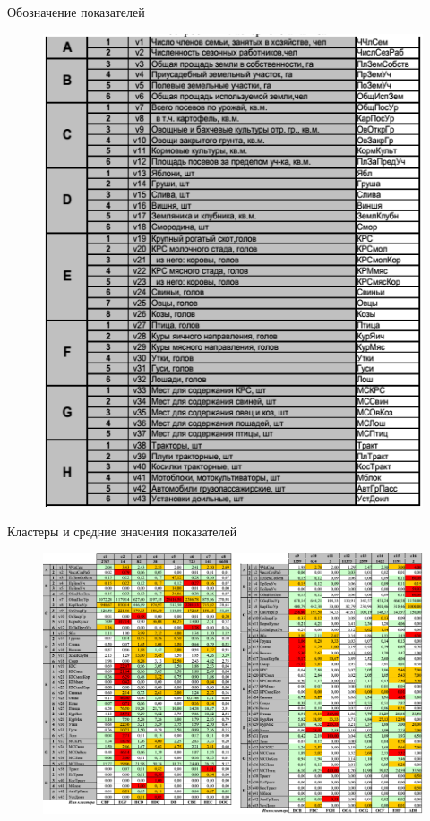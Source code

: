 \documentclass{beamer}
\begin{document}
\begin{frame}
Обозначение показателей
\begin{figure}[h]
\centering
\includegraphics[scale=0.5]{images/lec07-pic42.png}
\end{figure}
\end{frame}

\begin{frame}
Кластеры и средние значения показателей
\begin{figure}[h]
\centering
\includegraphics[scale=0.4]{images/lec07-pic43.png}
\end{figure}
\end{frame}
\end{document}
